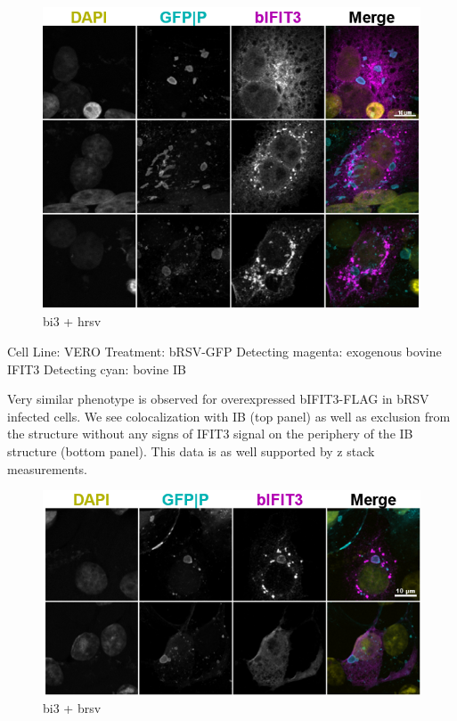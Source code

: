 \begin{figure}
    \centering
    \includegraphics[width=1\linewidth]{09. Chapter 4/Figs/04. IFIT3/05. bi3 hrsv.png}
    \caption[bi3 + hrsv]{bi3 + hrsv}
    \label{fig:bi3 + hrsv}
\end{figure}

Cell Line: VERO \newline
Treatment: bRSV-GFP \newline
Detecting magenta: exogenous bovine IFIT3 \newline
Detecting cyan: bovine IB \newline

Very similar phenotype is observed for overexpressed bIFIT3-FLAG in bRSV infected cells. We see colocalization with IB (top panel) as well as exclusion from the structure without any signs of IFIT3 signal on the periphery of the IB structure (bottom panel). This data is as well supported by z stack measurements.

\begin{figure}
    \centering
    \includegraphics[width=1\linewidth]{09. Chapter 4/Figs/04. IFIT3/06. bi3 brsv.png}
    \caption[bi3 + brsv]{bi3 + brsv}
    \label{fig:bi3 + brsv}
\end{figure}

